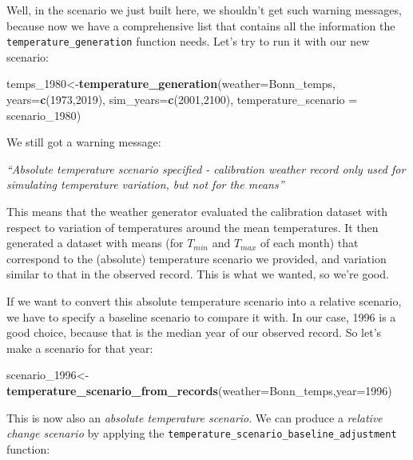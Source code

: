 \documentclass[
]{book}
\newenvironment{Shaded}{\begin{snugshade}}{\end{snugshade}}
\newcommand{\DataTypeTok}[1]{\textcolor[rgb]{0.13,0.29,0.53}{#1}}
\newcommand{\DecValTok}[1]{\textcolor[rgb]{0.00,0.00,0.81}{#1}}
\newcommand{\KeywordTok}[1]{\textcolor[rgb]{0.13,0.29,0.53}{\textbf{#1}}}
\newcommand{\NormalTok}[1]{#1}
\begin{document}
Well, in the scenario we just built here, we shouldn't get such warning messages, because now we have a comprehensive list that contains all the information the \texttt{temperature\_generation} function needs. Let's try to run it with our new scenario:

\begin{Shaded}
\begin{Highlighting}[]
\NormalTok{temps_}\DecValTok{1980}\NormalTok{<-}\KeywordTok{temperature_generation}\NormalTok{(}\DataTypeTok{weather=}\NormalTok{Bonn_temps, }\DataTypeTok{years=}\KeywordTok{c}\NormalTok{(}\DecValTok{1973}\NormalTok{,}\DecValTok{2019}\NormalTok{),}
                                   \DataTypeTok{sim_years=}\KeywordTok{c}\NormalTok{(}\DecValTok{2001}\NormalTok{,}\DecValTok{2100}\NormalTok{),}
                                   \DataTypeTok{temperature_scenario =}\NormalTok{ scenario_}\DecValTok{1980}\NormalTok{)}
\end{Highlighting}
\end{Shaded}

We still got a warning message:

\emph{``Absolute temperature scenario specified - calibration weather record only used for simulating temperature variation, but not for the means''}

This means that the weather generator evaluated the calibration dataset with respect to variation of temperatures around the mean temperatures. It then generated a dataset with means (for \(T_{min}\) and \(T_{max}\) of each month) that correspond to the (absolute) temperature scenario we provided, and variation similar to that in the observed record. This is what we wanted, so we're good.

If we want to convert this absolute temperature scenario into a relative scenario, we have to specify a baseline scenario to compare it with. In our case, 1996 is a good choice, because that is the median year of our observed record. So let's make a scenario for that year:

\begin{Shaded}
\begin{Highlighting}[]
\NormalTok{scenario_}\DecValTok{1996}\NormalTok{<-}\KeywordTok{temperature_scenario_from_records}\NormalTok{(}\DataTypeTok{weather=}\NormalTok{Bonn_temps,}\DataTypeTok{year=}\DecValTok{1996}\NormalTok{)}
\end{Highlighting}
\end{Shaded}

This is now also an \emph{absolute temperature scenario}. We can produce a \emph{relative change scenario} by applying the \texttt{temperature\_scenario\_baseline\_adjustment} function:
\end{document}

